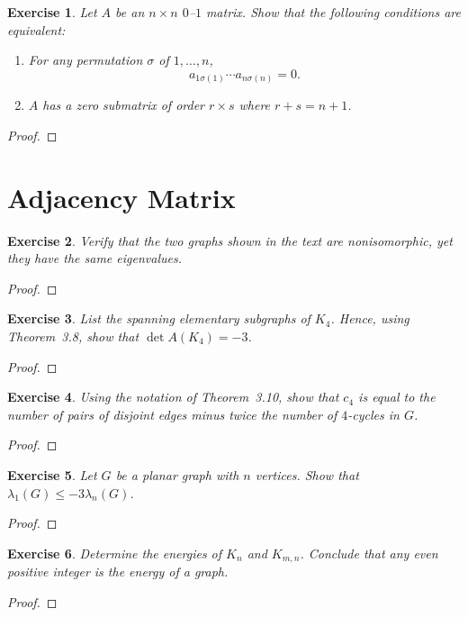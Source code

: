 \documentclass[11pt]{article}
\newtheorem{exercise}{Exercise}[section]
\theoremstyle{definition}
\begin{document}
\begin{exercise}
Let $A$ be an $n\times n$ $0$--$1$ matrix. Show that the following conditions are equivalent:
\begin{enumerate}
\item[(i)] For any permutation $\sigma$ of $1,\ldots,n$,
\[
a_{1\sigma(1)}\cdots a_{n\sigma(n)}=0.
\]
\item[(ii)] $A$ has a zero submatrix of order $r\times s$ where $r+s=n+1$.
\end{enumerate}
\end{exercise}
\begin{proof}
\end{proof}

\clearpage
\section{Adjacency Matrix}

\begin{exercise}
Verify that the two graphs shown in the text are nonisomorphic, yet they have the same
eigenvalues.
\end{exercise}
\begin{proof}
\end{proof}

\begin{exercise}
List the spanning elementary subgraphs of $K_4$. Hence, using Theorem~3.8, show
that $\det A(K_4)=-3$.
\end{exercise}
\begin{proof}
\end{proof}

\begin{exercise}
Using the notation of Theorem~3.10, show that $c_4$ is equal to the number of pairs of
disjoint edges minus twice the number of $4$-cycles in $G$.
\end{exercise}
\begin{proof}
\end{proof}

\begin{exercise}
Let $G$ be a planar graph with $n$ vertices. Show that $\lambda_1(G)\le -3\lambda_n(G)$.
\end{exercise}
\begin{proof}
\end{proof}

\begin{exercise}
Determine the energies of $K_n$ and $K_{m,n}$. Conclude that any even positive integer
is the energy of a graph.
\end{exercise}
\begin{proof}
\end{proof}
\end{document}
